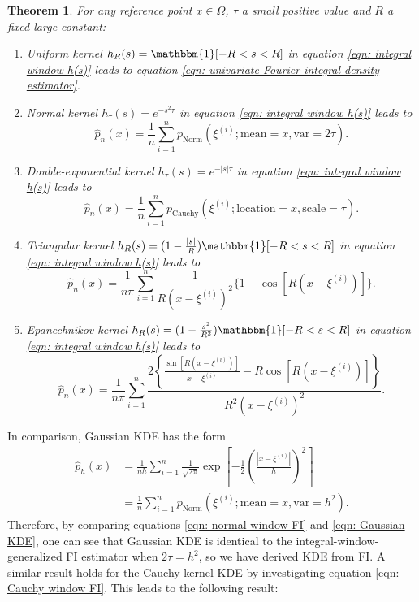\documentclass[%
 reprint,
 amsmath,amssymb,
 aps,
]{revtex4-2}
\newtheorem{theorem}{Theorem}[section]
\begin{document}
\begin{theorem} \label{theorem: FI integral windows}
For any reference point $x \in \Omega$, $\tau$ a small positive value and $R$ a fixed large constant:
    \begin{enumerate}
        \item Uniform kernel $h_R(s) = \mathbbm{1}[-R < s < R]$ in equation \eqref{eqn: integral window h(s)} leads to equation \eqref{eqn: univariate Fourier integral density estimator}.
        \item Normal kernel $h_\tau(s) = e^{-s^2\tau}$ in equation \eqref{eqn: integral window h(s)} leads to
        \begin{equation} \label{eqn: normal window FI}
            \hat{p}_n(x) = \frac{1}{n} \sum_{i = 1}^n p_\text{Norm}(\xi^{(i)}; \text{mean} = x, \text{var} = 2\tau).
        \end{equation}
        \item Double-exponential kernel $h_\tau(s) = e^{-|s|\tau}$ in equation \eqref{eqn: integral window h(s)} leads to \begin{equation} \label{eqn: Cauchy window FI}
            \hat{p}_n(x) = \frac{1}{n} \sum_{i = 1}^n p_\text{Cauchy}(\xi^{(i)}; \text{location} = x, \text{scale} = \tau).
        \end{equation}
        \item Triangular kernel $h_R(s) = (1 - \frac{|s|}{R}) \mathbbm{1}[-R < s < R]$ in equation \eqref{eqn: integral window h(s)} leads to
        \begin{equation} \label{eqn: triangular kernel window FI}
            \hat{p}_n(x) = \frac{1}{n\pi} \sum_{i = 1}^n \frac{1}{R(x - \xi^{(i)})^2}\{1 - \cos[R(x - \xi^{(i)})]\}.
        \end{equation}
        \item Epanechnikov kernel $h_R(s) = (1 - \frac{s^2}{R^2}) \mathbbm{1}[-R < s < R]$ in equation \eqref{eqn: integral window h(s)} leads to
        \begin{equation} \label{eqn: Epanechnikov kernel window FI}
            \hat{p}_n(x) = \frac{1}{n\pi} \sum_{i = 1}^n \frac{2\left\{\frac{\sin[R(x - \xi^{(i)})]}{x - \xi^{(i)}} - R\cos[R(x - \xi^{(i)})] \right\}}{R^2(x - \xi^{(i)})^2}.
        \end{equation}
    \end{enumerate}
\end{theorem}

In comparison, Gaussian KDE has the form
\begin{align} \label{eqn: Gaussian KDE}
    \hat{p}_h(x) & = \frac{1}{nh}\sum_{i = 1}^n \frac{1}{\sqrt{2\pi}}\exp\left[-\frac{1}{2}\left(\frac{|x - \xi^{(i)}|}{h} \right)^2 \right] \\
    & = \frac{1}{n}\sum_{i = 1}^n p_\text{Norm}(\xi^{(i)}; \text{mean} = x, \text{var} = h^2).
\end{align}
Therefore, by comparing equations \eqref{eqn: normal window FI} and \eqref{eqn: Gaussian KDE}, one can see that Gaussian KDE is identical to the integral-window-generalized FI estimator when $2\tau = h^2$, so we have derived KDE from FI. A similar result holds for the Cauchy-kernel KDE by investigating equation \eqref{eqn: Cauchy window FI}. This leads to the following result:
\end{document}
